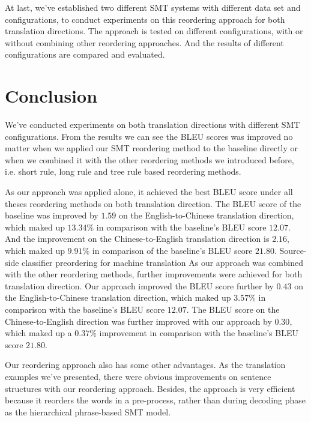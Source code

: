 At last, we've established two different SMT systems with different data set and configurations, to conduct experiments on this reordering approach for both translation directions. The approach is tested on different configurations, with or without combining other reordering approaches. And the results of different configurations are compared and evaluated.

\section{Conclusion}
\label{ch:Discussion:sec:Conclusion}

We've conducted experiments on both translation directions with different SMT configurations. From the results we can see the BLEU scores was improved no matter when we applied our SMT reordering method to the baseline directly or when we combined it with the other reordering methods we introduced before, i.e. short rule, long rule and tree rule based reordering methods.

As our approach was applied alone, it achieved the best BLEU score under all theses reordering methods on both translation direction. The BLEU score of the baseline was improved by $1.59$ on the English-to-Chinese translation direction, which maked up $13.34\%$ in comparison with the baseline's BLEU score $12.07$. And the improvement on the Chinese-to-English translation direction is $2.16$, which maked up $9.91\%$ in comparison of the baseline's BLEU score $21.80$.
Source-side classifier preordering for machine translation
As our approach was combined with the other reordering methods, further improvements were achieved for both translation direction. Our approach improved the BLEU score further by $0.43$ on the English-to-Chinese translation direction, which maked up $3.57\%$ in comparison with the baseline's BLEU score $12.07$. The BLEU score on the Chinese-to-English direction was further improved with our approach by $0.30$, which maked up a $0.37\%$ improvement in comparison with the baseline's BLEU score $21.80$.

Our reordering approach also has some other advantages. As the translation examples we've presented, there were obvious improvements on sentence structures with our reordering approach. Besides, the approach is very efficient because it reorders the words in a pre-process, rather than during decoding phase as the hierarchical phrase-based SMT model. 

